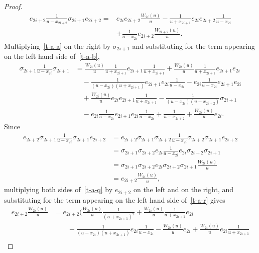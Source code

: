 \documentclass[11pt,a4paper,reqno,svgnames]{amsart}
\theoremstyle{plain}
\theoremstyle{definition}
\numberwithin{equation}{section}
\begin{document}
\begin{proof}
\begin{equation}\label{t-a-r}
\begin{split}
e_{2i+2}\frac{1}{u-x_{2i+2}}\sigma_{2i+1}e_{2i+2}=&
e_{2i}e_{2i+2}\frac{W_{2i}(u)}{u}-\frac{1}{u+x_{2i+1}}e_{2i}e_{2i+2}\frac{1}{u-x_{2i}}\\
&+\frac{1}{u-x_{2i}}e_{2i+2}\frac{W_{2i+2}(u)}{u}.
\end{split}
\end{equation}
Multiplying~\eqref{t-a-a} on the right by $\sigma_{2i+1}$ and substituting for the term appearing on the left hand side of~\eqref{t-a-b}, 
\begin{equation}\label{t-a-q}
\begin{split}
\sigma_{2i+1}\frac{1}{u-x_{2i}}\sigma_{2i+1}&= \frac{W_{2i}(u)}{u}\frac{1}{u+x_{2i+1}}e_{2i+1}\frac{1}{u+x_{2i+1}}
+\frac{W_{2i}(u)}{u}\frac{1}{u+x_{2i+1}}e_{2i+1}e_{2i} \\
&\quad-\frac{1}{(u-x_{2i})(u+x_{2i+1})}e_{2i+1}e_{2i}\frac{1}{u-x_{2i}}
- e_{2i}\frac{1}{u-x_{2i}}e_{2i+1}e_{2i}\\
&\quad+\frac{W_{2i}(u)}{u}e_{2i}e_{2i+1}\frac{1}{u+x_{2i+1}}-\frac{1}{(u-x_{2i})(u-x_{2i+2})}\sigma_{2i+1}\\ 
&\quad-e_{2i}\frac{1}{u-x_{2i}}e_{2i+1}e_{2i}\frac{1}{u-x_{2i}} +\frac{1}{u-x_{2i+2}}+\frac{W_{2i}(u)}{u}e_{2i}.
\end{split}
\end{equation}
Since
\begin{align*}
e_{2i+2}\sigma_{2i+1}\frac{1}{u-x_{2i}}\sigma_{2i+1}e_{2i+2}&
=e_{2i+2}\sigma_{2i+1}\sigma_{2i+2}\frac{1}{u-x_{2i}}\sigma_{2i+2}\sigma_{2i+1}e_{2i+2}\\
&=\sigma_{2i+1}\sigma_{2i+2}e_{2i}\frac{1}{u-x_{2i}}e_{2i}\sigma_{2i+2}\sigma_{2i+1}\\
&=\sigma_{2i+1}\sigma_{2i+2}e_{2i}\sigma_{2i+2}\sigma_{2i+1}\frac{W_{2i}(u)}{u}\\ 
&=e_{2i+2}\frac{W_{2i}(u)}{u},
\end{align*}
multiplying both sides of~\eqref{t-a-q} by $e_{2i+2}$ on the left and on the right, and substituting for the term appearing on the left hand side of~\eqref{t-a-r} gives
\begin{align*}
e_{2i+2}\frac{W_{2i}(u)}{u}&=
e_{2i+2}\bigg(\frac{W_{2i}(u)}{u}\frac{1}{(u+x_{2i+1})^2}
+\frac{W_{2i}(u)}{u}\frac{1}{u+x_{2i+1}}e_{2i}\\
&\qquad-\frac{1}{(u-x_{2i})(u+x_{2i+1})}e_{2i}\frac{1}{u-x_{2i}}-\frac{W_{2i}(u)}{u}e_{2i}
+\frac{W_{2i}(u)}{u}e_{2i}\frac{1}{u+x_{2i+1}}\\

\end{align*}
\end{proof}
\end{document}
